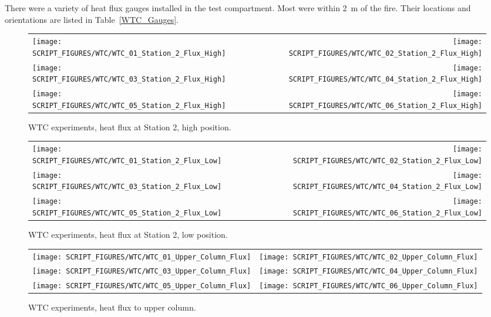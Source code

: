 There were a variety of heat flux gauges installed in the test compartment. Most were within 2~m of the fire. Their locations and orientations are listed in Table~\ref{WTC_Gauges}.


\begin{figure}[h!]
\begin{tabular*}{\textwidth}{l@{\extracolsep{\fill}}r}
\texttt{[image: SCRIPT\_FIGURES/WTC/WTC\_01\_Station\_2\_Flux\_High]} &
\texttt{[image: SCRIPT\_FIGURES/WTC/WTC\_02\_Station\_2\_Flux\_High]} \\
\texttt{[image: SCRIPT\_FIGURES/WTC/WTC\_03\_Station\_2\_Flux\_High]} &
\texttt{[image: SCRIPT\_FIGURES/WTC/WTC\_04\_Station\_2\_Flux\_High]} \\
\texttt{[image: SCRIPT\_FIGURES/WTC/WTC\_05\_Station\_2\_Flux\_High]} &
\texttt{[image: SCRIPT\_FIGURES/WTC/WTC\_06\_Station\_2\_Flux\_High]}
\end{tabular*}
\caption[WTC experiments, heat flux at Station 2, high position]
{WTC experiments, heat flux at Station 2, high position.}
\label{NIST_WTC_Station_2_Flux_High}
\end{figure}

\newpage

\begin{figure}[p]
\begin{tabular*}{\textwidth}{l@{\extracolsep{\fill}}r}
\texttt{[image: SCRIPT\_FIGURES/WTC/WTC\_01\_Station\_2\_Flux\_Low]} &
\texttt{[image: SCRIPT\_FIGURES/WTC/WTC\_02\_Station\_2\_Flux\_Low]} \\
\texttt{[image: SCRIPT\_FIGURES/WTC/WTC\_03\_Station\_2\_Flux\_Low]} &
\texttt{[image: SCRIPT\_FIGURES/WTC/WTC\_04\_Station\_2\_Flux\_Low]} \\
\texttt{[image: SCRIPT\_FIGURES/WTC/WTC\_05\_Station\_2\_Flux\_Low]} &
\texttt{[image: SCRIPT\_FIGURES/WTC/WTC\_06\_Station\_2\_Flux\_Low]}
\end{tabular*}
\caption[WTC experiments, heat flux at Station 2, low position]
{WTC experiments, heat flux at Station 2, low position.}
\label{NIST_WTC_Station_2_Flux_Low}
\end{figure}

\begin{figure}[p]
\begin{tabular*}{\textwidth}{l@{\extracolsep{\fill}}r}
\texttt{[image: SCRIPT\_FIGURES/WTC/WTC\_01\_Upper\_Column\_Flux]} &
\texttt{[image: SCRIPT\_FIGURES/WTC/WTC\_02\_Upper\_Column\_Flux]} \\
\texttt{[image: SCRIPT\_FIGURES/WTC/WTC\_03\_Upper\_Column\_Flux]} &
\texttt{[image: SCRIPT\_FIGURES/WTC/WTC\_04\_Upper\_Column\_Flux]} \\
\texttt{[image: SCRIPT\_FIGURES/WTC/WTC\_05\_Upper\_Column\_Flux]} &
\texttt{[image: SCRIPT\_FIGURES/WTC/WTC\_06\_Upper\_Column\_Flux]}
\end{tabular*}
\caption[WTC experiments, heat flux to upper column]
{WTC experiments, heat flux to upper column.}
\label{NIST_WTC_Upper_Column_Flux}
\end{figure}

